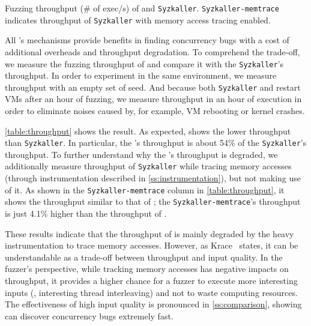 %
\begin{table}[t]
  \small
  \centering
  
  \caption{Fuzzing throughput (\# of exec/s) of \sys and
    \texttt{Syzkaller}. \texttt{Syzkaller-memtrace} indicates
    throughput of \texttt{Syzkaller} with memory access tracing
    enabled.}
  \label{table:throughput}
\end{table}
%
All \sys's mechanisms provide benefits in finding concurrency bugs
with a cost of additional overheads and throughput degradation.
%
To comprehend the trade-off, we measure the fuzzing throughput of \sys
and compare it with the \texttt{Syzkaller}'s throughput.
%
In order to experiment in the same environment, we measure throughput
with an empty set of seed. And because both \texttt{Syzkaller} and
\sys restart VMs after an hour of fuzzing, we measure throughput in an
hour of execution in order to eliminate noises caused by, for example,
VM rebooting or kernel crashes.



\autoref{table:throughput} shows the result. As expected, \sys shows
the lower throughput than \texttt{Syzkaller}. In particular, the
\sys's throughput is about 54\% of the \texttt{Syzkaller}'s
throughput.
%
To further understand why the \sys's throughput is degraded, we
additionally measure throughput of \texttt{Syzkaller} while tracing
memory accesses (through instrumentation described in
\autoref{ss:instrumentation}), but not making use of it.
%
As shown in the \texttt{Syzkaller-memtrace} column in
\autoref{table:throughput}, it shows the throughput similar to that of
\sys; the \texttt{Syzkaller-memtrace}'s throughput is just 4.1\%
higher than the throughput of \sys.


These results indicate that the throughput of \sys is mainly degraded
by the heavy instrumentation to trace memory accesses.
%
However, as Krace~\cite{krace} states, it can be understandable as a
trade-off between throughput and input quality.
%
In the fuzzer's perspective, while tracking memory accesses has
negative impacts on throughput, it provides a higher chance for a
fuzzer to execute more interesting inputs (\ie, interesting thread
interleaving) and not to waste computing resources.
%
The effectiveness of high input quality is pronounced in
\autoref{ss:comparison}, showing \sys can discover concurrency bugs
extremely fast.





